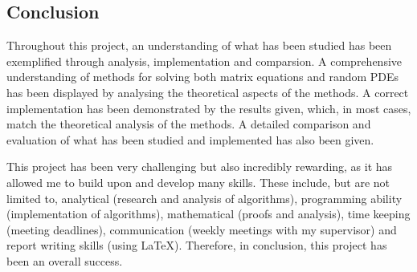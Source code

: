 \documentclass[11pt]{article}
\numberwithin{equation}{section}
\begin{document}
\subsection{Conclusion}
Throughout this project, an understanding of what has been studied has been exemplified through analysis, implementation and comparsion. A comprehensive understanding of methods for solving both matrix equations and random PDEs has been displayed by analysing the theoretical aspects of the methods. A correct implementation has been demonstrated by the results given, which, in most cases, match the theoretical analysis of the methods. A detailed comparison and evaluation of what has been studied and implemented has also been given. 

This project has been very challenging but also incredibly rewarding, as it has allowed me to build upon and develop many skills. These include, but are not limited to, analytical (research and analysis of algorithms), programming ability (implementation of algorithms), mathematical (proofs and analysis), time keeping (meeting deadlines), communication (weekly meetings with my supervisor) and report writing skills (using \LaTeX). Therefore, in conclusion, this project has been an overall success.

\newpage



\end{document}
